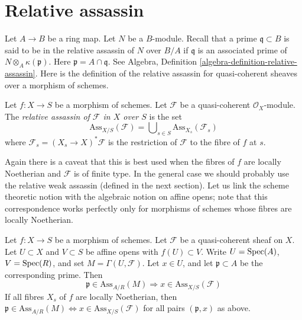 \section{Relative assassin}
\label{section-relative-assassin}

\noindent
Let $A \to B$ be a ring map. Let $N$ be a $B$-module. Recall that
a prime $\mathfrak q \subset B$ is said to be in the relative assassin
of $N$ over $B/A$ if $\mathfrak q$ is an associated prime of
$N \otimes_A \kappa(\mathfrak p)$. Here $\mathfrak p = A \cap \mathfrak q$.
See Algebra, Definition \ref{algebra-definition-relative-assassin}.
Here is the definition of the relative assassin for quasi-coherent
sheaves over a morphism of schemes.

\begin{definition}
\label{definition-relative-assassin}
Let $f : X \to S$ be a morphism of schemes.
Let $\mathcal{F}$ be a quasi-coherent $\mathcal{O}_X$-module.
The {\it relative assassin of $\mathcal{F}$ in $X$ over $S$}
is the set
$$
\text{Ass}_{X/S}(\mathcal{F}) =
\bigcup\nolimits_{s \in S} \text{Ass}_{X_s}(\mathcal{F}_s)
$$
where $\mathcal{F}_s = (X_s \to X)^*\mathcal{F}$ is the restriction
of $\mathcal{F}$ to the fibre of $f$ at $s$.
\end{definition}

\noindent
Again there is a caveat that this is best used when the fibres of $f$
are locally Noetherian and $\mathcal{F}$ is of finite type. In the general
case we should probably use the relative weak assassin (defined in the next
section). Let us link the scheme theoretic notion with the algebraic notion
on affine opens; note that this correspondence works perfectly only
for morphisms of schemes whose fibres are locally Noetherian.

\begin{lemma}
\label{lemma-relative-assassin-affine-open}
Let $f : X \to S$ be a morphism of schemes.
Let $\mathcal{F}$ be a quasi-coherent sheaf on $X$.
Let $U \subset X$ and $V \subset S$ be affine opens
with $f(U) \subset V$. Write $U = \mathop{\mathrm{Spec}}(A)$, $V = \mathop{\mathrm{Spec}}(R)$, and set
$M = \Gamma(U, \mathcal{F})$.
Let $x \in U$, and let $\mathfrak p \subset A$ be the corresponding prime.
Then
$$
\mathfrak p \in \text{Ass}_{A/R}(M) \Rightarrow
x \in \text{Ass}_{X/S}(\mathcal{F})
$$
If all fibres $X_s$ of $f$ are locally Noetherian, then
$\mathfrak p \in \text{Ass}_{A/R}(M) \Leftrightarrow
x \in \text{Ass}_{X/S}(\mathcal{F})$
for all pairs $(\mathfrak p, x)$ as above.
\end{lemma}


